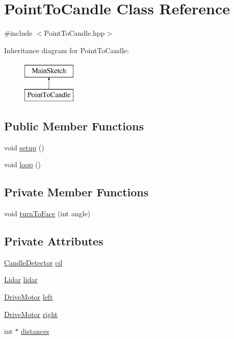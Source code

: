 \hypertarget{classPointToCandle}{\section{Point\-To\-Candle Class Reference}
\label{classPointToCandle}
}


{\ttfamily \#include $<$Point\-To\-Candle.\-hpp$>$}

Inheritance diagram for Point\-To\-Candle\-:\begin{figure}[H]
\begin{center}
\leavevmode
\includegraphics[height=2.000000cm]{classPointToCandle}
\end{center}
\end{figure}
\subsection*{Public Member Functions}
\begin{DoxyCompactItemize}
\item 
void \hyperlink{classPointToCandle_a99ace73720580afda4a41cf01c2418a2}{setup} ()
\item 
void \hyperlink{classPointToCandle_a446be96046c19b1eff25cf2fcc92ccec}{loop} ()
\end{DoxyCompactItemize}
\subsection*{Private Member Functions}
\begin{DoxyCompactItemize}
\item 
void \hyperlink{classPointToCandle_a495758f0cc24a3287002d1dd1cdc9698}{turn\-To\-Face} (int angle)
\end{DoxyCompactItemize}
\subsection*{Private Attributes}
\begin{DoxyCompactItemize}
\item 
\hyperlink{classCandleDetector}{Candle\-Detector} \hyperlink{classPointToCandle_a832de7f053912ab631c7f224982bde52}{cd}
\item 
\hyperlink{classLidar}{Lidar} \hyperlink{classPointToCandle_a74def04bd7985f1ae2dfb83cb4ad7d40}{lidar}
\item 
\hyperlink{classDriveMotor}{Drive\-Motor} \hyperlink{classPointToCandle_a8976db9c7a0e1484762bf27c829cb06f}{left}
\item 
\hyperlink{classDriveMotor}{Drive\-Motor} \hyperlink{classPointToCandle_ad0913e5dfa04c7205c16cc893ff238c5}{right}
\item 
int $\ast$ \hyperlink{classPointToCandle_aa905d6ae2cd3d72225020c87f74e30e0}{distances}
\end{DoxyCompactItemize}


